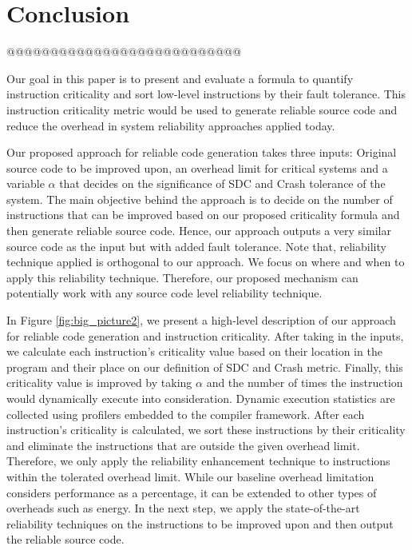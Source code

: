 \section{Conclusion}\label{sec:conclusion}
@@@@@@@@@@@@@@@@@@@@@@@@@@@

Our goal in this paper is to present and evaluate a formula to quantify instruction criticality and sort low-level instructions by their fault tolerance. This instruction criticality metric would be used to generate reliable source code and reduce the overhead in system reliability approaches applied today. 

Our proposed approach for reliable code generation takes three inputs: Original source code to be improved upon, an overhead limit for critical systems and a variable $\alpha$ that decides on the significance of SDC and Crash tolerance of the system. The main objective behind the approach is to decide on the number of instructions that can be improved based on our proposed criticality formula and then generate reliable source code. Hence, our approach outputs a very similar source code as the input but with added fault tolerance. Note that, reliability technique applied is orthogonal to our approach. We focus on where and when to apply this reliability technique. Therefore, our proposed mechanism can potentially work with any source code level reliability technique. 

In Figure \ref{fig:big_picture2}, we present a high-level description of our approach for reliable code generation and instruction criticality. After taking in the inputs, we calculate each instruction's criticality value based on their location in the program and their place on our definition of SDC and Crash metric. Finally, this criticality value is improved by taking $\alpha$ and the number of times the instruction would dynamically execute into consideration. Dynamic execution statistics are collected using profilers embedded to the compiler framework. After each instruction's criticality is calculated, we sort these instructions by their criticality and eliminate the instructions that are outside the given overhead limit. Therefore, we only apply the reliability enhancement technique to instructions within the tolerated overhead limit. While our baseline overhead limitation considers performance as a percentage, it can be extended to other types of overheads such as energy. In the next step, we apply the state-of-the-art reliability techniques on the instructions to be improved upon and then output the reliable source code. 

